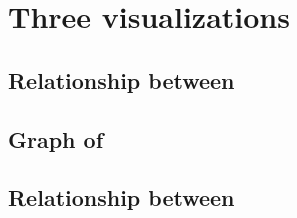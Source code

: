 \documentclass{article}
\begin{document}
\section{Three visualizations}

\subsection{Relationship between}

\subsection{Graph of}

\subsection{Relationship between}
\end{document}
